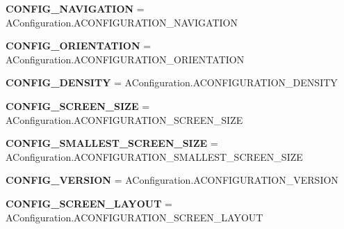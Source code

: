 \begin{DoxyCompactItemize}
{\bfseries C\+O\+N\+F\+I\+G\+\_\+\+N\+A\+V\+I\+G\+A\+T\+I\+ON} = A\+Configuration.\+A\+C\+O\+N\+F\+I\+G\+U\+R\+A\+T\+I\+O\+N\+\_\+\+N\+A\+V\+I\+G\+A\+T\+I\+ON
\item 
\mbox{\label{classtable_1_1ResTable__config_1_1Config_aad7b212fa13c17db08ed5dc8e79d2860}} 
{\bfseries C\+O\+N\+F\+I\+G\+\_\+\+O\+R\+I\+E\+N\+T\+A\+T\+I\+ON} = A\+Configuration.\+A\+C\+O\+N\+F\+I\+G\+U\+R\+A\+T\+I\+O\+N\+\_\+\+O\+R\+I\+E\+N\+T\+A\+T\+I\+ON
\item 
\mbox{\label{classtable_1_1ResTable__config_1_1Config_ada4e8182c916ec336d013215a3dd34df}} 
{\bfseries C\+O\+N\+F\+I\+G\+\_\+\+D\+E\+N\+S\+I\+TY} = A\+Configuration.\+A\+C\+O\+N\+F\+I\+G\+U\+R\+A\+T\+I\+O\+N\+\_\+\+D\+E\+N\+S\+I\+TY
\item 
\mbox{\label{classtable_1_1ResTable__config_1_1Config_a0c57b8d15770b217790f5ec40c843be4}} 
{\bfseries C\+O\+N\+F\+I\+G\+\_\+\+S\+C\+R\+E\+E\+N\+\_\+\+S\+I\+ZE} = A\+Configuration.\+A\+C\+O\+N\+F\+I\+G\+U\+R\+A\+T\+I\+O\+N\+\_\+\+S\+C\+R\+E\+E\+N\+\_\+\+S\+I\+ZE
\item 
\mbox{\label{classtable_1_1ResTable__config_1_1Config_ad59c867a294732ae386fb6290e770dc0}} 
{\bfseries C\+O\+N\+F\+I\+G\+\_\+\+S\+M\+A\+L\+L\+E\+S\+T\+\_\+\+S\+C\+R\+E\+E\+N\+\_\+\+S\+I\+ZE} = A\+Configuration.\+A\+C\+O\+N\+F\+I\+G\+U\+R\+A\+T\+I\+O\+N\+\_\+\+S\+M\+A\+L\+L\+E\+S\+T\+\_\+\+S\+C\+R\+E\+E\+N\+\_\+\+S\+I\+ZE
\item 
\mbox{\label{classtable_1_1ResTable__config_1_1Config_a28f7710157bab0fdcbbbbf6315c17935}} 
{\bfseries C\+O\+N\+F\+I\+G\+\_\+\+V\+E\+R\+S\+I\+ON} = A\+Configuration.\+A\+C\+O\+N\+F\+I\+G\+U\+R\+A\+T\+I\+O\+N\+\_\+\+V\+E\+R\+S\+I\+ON
\item 
\mbox{\label{classtable_1_1ResTable__config_1_1Config_a91b19f0d902a293c014d2a0c7954a002}} 
{\bfseries C\+O\+N\+F\+I\+G\+\_\+\+S\+C\+R\+E\+E\+N\+\_\+\+L\+A\+Y\+O\+UT} = A\+Configuration.\+A\+C\+O\+N\+F\+I\+G\+U\+R\+A\+T\+I\+O\+N\+\_\+\+S\+C\+R\+E\+E\+N\+\_\+\+L\+A\+Y\+O\+UT
\item 
\mbox{\label{classtable_1_1ResTable__config_1_1Config_af3703771606c20c91c22a72cc957be23}} 

\end{DoxyCompactItemize}
